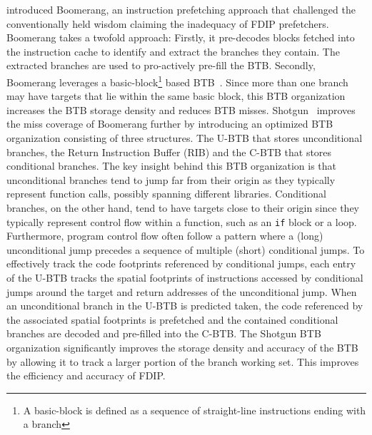 \documentclass[../main.tex]{subfiles}
\begin{document}
\begin{refsection}
\textcite{kumar17_boomer} introduced Boomerang, an instruction
prefetching approach that challenged the conventionally held wisdom
claiming the inadequacy of FDIP prefetchers. Boome\-rang takes a twofold
approach: Firstly, it pre-decodes blocks fetched into the instruction
cache to identify and extract the branches they contain. The extracted
branches are used to pro-actively pre-fill the BTB. Secondly,
Boomerang leverages a basic-block\footnote{A basic-block is defined as
  a sequence of straight-line instructions ending with a branch} based
BTB~\cite{yeh92_compr_instr_fetch_mechan_for}. Since more than one
branch may have targets that lie within the same basic block, this BTB
organization increases the BTB storage density and reduces BTB
misses. Shotgun~\cite{kumar18_blast_throug_front_end_bottl_with_shotg,kumar20_shoot_down_server_front_end_bottl}
improves the miss coverage of Boomerang further by introducing an
optimized BTB organization consisting of three structures. The U-BTB
that stores unconditional branches, the Return Instruction Buffer
(RIB) and the C-BTB that stores conditional branches. The key insight
behind this BTB organization is that unconditional branches tend to
jump far from their origin as they typically represent function calls,
possibly spanning different libraries. Conditional branches, on the
other hand, tend to have targets close to their origin since they
typically represent control flow within a function, such as an
\texttt{if} block or a loop. Furthermore, program control flow often
follow a pattern where a (long) unconditional jump precedes a sequence
of multiple (short) conditional jumps. To effectively track the code
footprints referenced by conditional jumps, each entry of the U-BTB
tracks the spatial footprints of instructions accessed by conditional
jumps around the target and return addresses of the unconditional
jump. When an unconditional branch in the U-BTB is predicted taken,
the code referenced by the associated spatial footprints is prefetched
and the contained conditional branches are decoded and pre-filled into
the C-BTB. The Shotgun BTB organization significantly improves the
storage density and accuracy of the BTB by allowing it to track a
larger portion of the branch working set. This improves the efficiency
and accuracy of FDIP.


\end{refsection}
\end{document}
